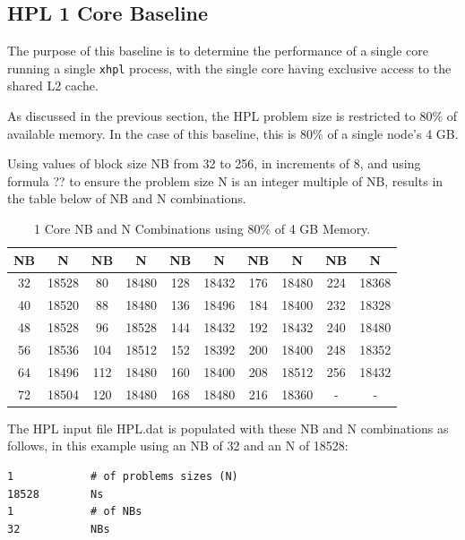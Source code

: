 \documentclass{report}
\begin{document}
%
%
\subsection{HPL 1 Core Baseline}

The purpose of this baseline is to determine the performance of a single core running a single \verb|xhpl| process, with the single core having exclusive access to the shared L2 cache. 

As discussed in the previous section, the HPL problem size is restricted to 80\% of available memory. In the case of this baseline, this is 80\% of a single node's 4 GB.

Using values of block size NB from 32 to 256, in increments of 8, and using formula ?? to ensure the problem size N is an integer multiple of NB, results in the table below of NB and N combinations.

\begin{table}[H]
\begin{center}
	\begin{tabular}{ |c|c|c|c|c|c|c|c|c|c| } 
		\hline
		NB & N & NB & N & NB & N & NB & N & NB & N \\ 
		\hline
		32 & 18528 &  80 & 18480 & 128 & 18432 & 176 & 18480 & 224 & 18368 \\ 
		40 & 18520 &  88 & 18480 & 136 & 18496 & 184 & 18400 & 232 & 18328 \\ 
 		48 & 18528 &  96 & 18528 & 144 & 18432 & 192 & 18432 & 240 & 18480 \\
		56 & 18536 & 104 & 18512 & 152 & 18392 & 200 & 18400 & 248 & 18352 \\ 
 		64 & 18496 & 112 & 18480 & 160 & 18400 & 208 & 18512 & 256 & 18432 \\
		72 & 18504 & 120 & 18480 & 168 & 18480 & 216 & 18360 &   - &     - \\ 
 		\hline
	\end{tabular}
\end{center}
\caption{\label{tab:table-name}1 Core NB and N Combinations using 80\% of 4 GB Memory.}
\end{table}

The HPL input file HPL.dat is populated with these NB and N combinations as follows, in this example using an NB of 32 and an N of 18528: 

\lstset{style=listing}
\begin{lstlisting}[numbers=none]
1            # of problems sizes (N)
18528        Ns
1            # of NBs
32           NBs
\end{lstlisting}
\end{document}
